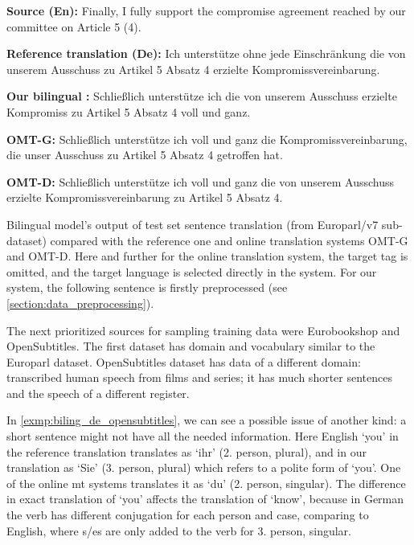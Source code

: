 \vspace{\baselineskip}
\begin{minipage}[t]{0.9\textwidth}

\textbf{Source (En):}   Finally, I fully support the compromise agreement reached by our committee on Article 5 (4).

\textbf{Reference translation (De):}
Ich unterstütze ohne jede Einschränkung die von unserem Ausschuss
zu Artikel 5 Absatz 4 erzielte Kompromissvereinbarung.

\textbf{Our bilingual :}
Schließlich unterstütze ich die von unserem Ausschuss erzielte
Kompromiss zu Artikel 5 Absatz 4 voll und ganz.

\textbf{OMT-G:}
Schließlich unterstütze ich voll und ganz die Kompromissvereinbarung,
die unser Ausschuss zu Artikel 5 Absatz 4 getroffen hat.

\textbf{OMT-D:}
Schließlich unterstütze ich voll und ganz die von unserem Ausschuss
erzielte Kompromissvereinbarung zu Artikel 5 Absatz 4.

	\begin{exmp}
	Bilingual  model's output of test set sentence
	translation (from Europarl/v7 sub-dataset)
	compared with the reference one and online
	translation systems OMT-G and OMT-D.
	Here and further for the online translation system, the target
	tag is omitted, and the target language is selected directly
	in the system.
	For our system, the following sentence is firstly preprocessed
	(see \cref{section:data_preprocessing}).
	\label{exmp:biling_de_europarl}
	\end{exmp}

\end{minipage}
\vspace{\baselineskip}


The next prioritized sources for sampling training data were
Eurobookshop and OpenSubtitles.
The first dataset has domain and vocabulary similar to the Europarl dataset.
OpenSubtitles dataset has data of a different domain:
transcribed human speech from films and series;
it has much shorter sentences and the speech of a different register.

In \cref{exmp:biling_de_opensubtitles}, we can see a possible issue of another kind: a short sentence might not have all
the needed information. Here English `you' in the reference translation
translates as `ihr' (2. person, plural), and in our translation
as `Sie' (3. person, plural) which refers to a polite form of `you'.
One of the online \acrshort{mt} systems translates it as
`du' (2. person, singular).
The difference in exact translation of `you' affects the translation of
`know', because in German the verb has different conjugation for each
person and case, comparing to English, where s/es are only added
to the verb for 3. person, singular.

